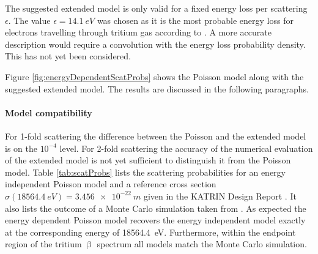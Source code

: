 The suggested extended model is only valid for a fixed energy loss per scattering $\epsilon$. The value $\epsilon=\SI{14.1}{eV}$ was chosen as it is the most probable energy loss for electrons travelling through tritium gas according to \cite{Aseev2000}. A more accurate description would require a convolution with the energy loss probability density. This has not yet been considered.

Figure \ref{fig:energyDependentScatProbs} shows the Poisson model along with the suggested extended model. The results are discussed in the following paragraphs.


\paragraph{Model compatibility}
 For 1-fold scattering the difference between the Poisson and the extended model is on the $10^{-4}$ level. For 2-fold scattering the accuracy of the numerical evaluation of the extended model is not yet sufficient to distinguish it from the Poisson model. Table \ref{tab:scatProbs} lists the scattering probabilities for an energy independent Poisson model and a reference cross section $\sigma(\SI{18564.4}{eV})=\SI{3.456e-22}{m}$ given in the KATRIN Design Report \cite{Angrik:2005ep}. It also lists the outcome of a Monte Carlo simulation taken from \cite{Groh2015}. As expected the energy dependent Poisson model recovers the energy independent model exactly at the corresponding energy of \SI{18564.4}{eV}. Furthermore, within the endpoint region of the tritium $\upbeta$ spectrum all models match the Monte Carlo simulation.


